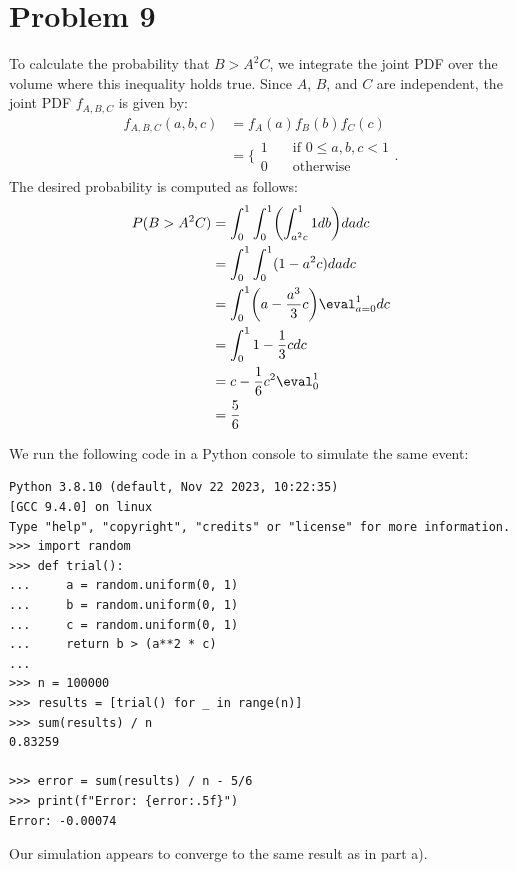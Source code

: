 \documentclass{homework}
\begin{document}
\section{Problem 9}

\begin{letterenum}
\item To calculate the probability that $B>A^2C$, we integrate the joint PDF over
the volume where this inequality holds true. Since $A$, $B$, and $C$ are independent,
the joint PDF $f_{A,B,C}$ is given by:
\begin{align*}
    f_{A,B,C}(a, b, c) &= f_A(a) f_B(b) f_C(c) \\
        &= \biggl\{
            \begin{array}{ll}
                1 & \quad \text{if } 0\leq a, b, c < 1 \\
                0 & \quad \text{otherwise}
            \end{array}
        \biggr.
\end{align*}
The desired probability is computed as follows:
\begin{align*}
    P(B > A^2C) &= \int_{0}^{1} \int_{0}^{1} \biggl(
        \int_{a^2 c}^{1} 1 db
    \biggr) da dc \\
        &= \int_{0}^{1} \int_0^1 (1 - a^2c) da dc \\
        &= \int_{0}^{1} \biggl(
            a - \frac{a^3}{3} c
        \biggr)\eval_{a=0}^1 dc \\
        &= \int_{0}^{1} 1 - \frac{1}{3}c dc \\
        &= c - \frac{1}{6} c^2 \eval_0^1 \\
        &= \frac{5}{6}
\end{align*}

\item We run the following code in a Python console to simulate the same event:
\begin{lstlisting}
Python 3.8.10 (default, Nov 22 2023, 10:22:35)
[GCC 9.4.0] on linux
Type "help", "copyright", "credits" or "license" for more information.
>>> import random
>>> def trial():
...     a = random.uniform(0, 1)
...     b = random.uniform(0, 1)
...     c = random.uniform(0, 1)
...     return b > (a**2 * c)
...
>>> n = 100000
>>> results = [trial() for _ in range(n)]
>>> sum(results) / n
0.83259

>>> error = sum(results) / n - 5/6
>>> print(f"Error: {error:.5f}")
Error: -0.00074
\end{lstlisting}

Our simulation appears to converge to the same result as in part a).
\end{letterenum}
\end{document}
